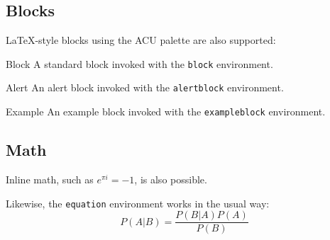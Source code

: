 \documentclass[11pt]{beamer}
\begin{document}
	\subsection{Blocks}
	\begin{frame}
		\LaTeX-style blocks using the ACU palette are also supported:
		\begin{block}{Block}
			A standard block invoked with the \texttt{block} environment.
		\end{block}

		\begin{alertblock}{Alert}
			An alert block invoked with the \texttt{alertblock} environment.
		\end{alertblock}

		\begin{exampleblock}{Example}
			An example block invoked with the \texttt{exampleblock} environment.
		\end{exampleblock}
	\end{frame}
	\subsection{Math}
	\begin{frame}
		Inline math, such as $e^{\pi i} = -1$, is also possible.\par
		\vspace{\baselineskip}

		Likewise, the \texttt{equation} environment works in the usual way:
		\begin{equation}
			P(A|B)=\frac{P(B|A)P(A)}{P(B)}
		\end{equation}
	\end{frame}
\end{document}

